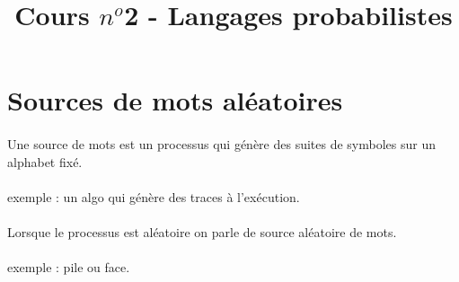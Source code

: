 \documentclass[a4paper,11pt]{article}
\newcommand{\p}{\paragraph*{}}
\begin{document}
\title{Cours $n^o$2 - Langages probabilistes}
\date{}
\maketitle
\section{Sources de mots aléatoires}
 \p Une source de mots est un processus qui génère des suites de symboles sur un
 alphabet fixé.
 \p exemple : un algo qui génère des traces à l'exécution.
 \p Lorsque le processus est aléatoire on parle de source aléatoire de mots.
 \p exemple : pile ou face.
\end{document}
